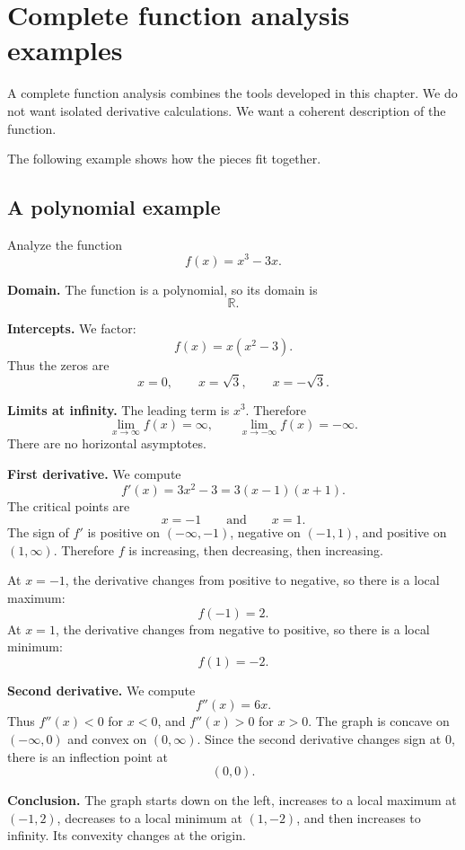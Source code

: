 \section{Complete function analysis examples}

A complete function analysis combines the tools developed in this chapter. We do not want isolated derivative calculations. We want a coherent description of the function.

The following example shows how the pieces fit together.

\subsection*{A polynomial example}

\begin{examplebox}
Analyze the function
\[
f(x)=x^3-3x.
\]

\textbf{Domain.} The function is a polynomial, so its domain is
\[
\mathbb{R}.
\]

\textbf{Intercepts.} We factor:
\[
f(x)=x(x^2-3).
\]
Thus the zeros are
\[
x=0,
\qquad
x=\sqrt3,
\qquad
x=-\sqrt3.
\]

\textbf{Limits at infinity.} The leading term is \(x^3\). Therefore
\[
\lim_{x\to\infty}f(x)=\infty,
\qquad
\lim_{x\to-\infty}f(x)=-\infty.
\]
There are no horizontal asymptotes.

\textbf{First derivative.} We compute
\[
f'(x)=3x^2-3=3(x-1)(x+1).
\]
The critical points are
\[
x=-1
\qquad\text{and}\qquad
x=1.
\]
The sign of \(f'\) is positive on \((-\infty,-1)\), negative on \((-1,1)\), and positive on \((1,\infty)\). Therefore \(f\) is increasing, then decreasing, then increasing.

At \(x=-1\), the derivative changes from positive to negative, so there is a local maximum:
\[
f(-1)=2.
\]
At \(x=1\), the derivative changes from negative to positive, so there is a local minimum:
\[
f(1)=-2.
\]

\textbf{Second derivative.} We compute
\[
f''(x)=6x.
\]
Thus \(f''(x)<0\) for \(x<0\), and \(f''(x)>0\) for \(x>0\). The graph is concave on \((-\infty,0)\) and convex on \((0,\infty)\). Since the second derivative changes sign at \(0\), there is an inflection point at
\[
(0,0).
\]

\textbf{Conclusion.} The graph starts down on the left, increases to a local maximum at \((-1,2)\), decreases to a local minimum at \((1,-2)\), and then increases to infinity. Its convexity changes at the origin.
\end{examplebox}

